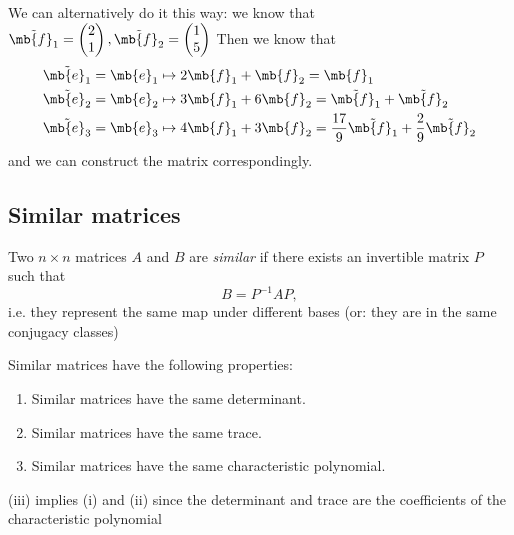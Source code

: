 \documentclass[a4paper]{article}
\begin{document}
\begin{eg}
  We can alternatively do it this way: we know that $\tilde{\mb{f}_1} = 
  \begin{pmatrix}
    2\\1
  \end{pmatrix}, \tilde{\mb{f}_2} = 
  \begin{pmatrix}
    1\\5
  \end{pmatrix}$
  Then we know that 
  \begin{align*}
    \tilde{\mb{e}_1} = \mb{e}_1 &\mapsto 2\mb{f}_1 + \mb{f}_2 = \mb{f}_1\\
    \tilde{\mb{e}_2} = \mb{e}_2 &\mapsto 3\mb{f}_1 + 6\mb{f}_2 = \tilde{\mb{f}_1} + \tilde{\mb{f}_2}\\
    \tilde{\mb{e}_3} = \mb{e}_3 &\mapsto 4\mb{f}_1 + 3\mb{f}_2 = \frac{17}{9} \tilde{\mb{f}_1} + \frac{2}{9}\tilde{\mb{f}_2}
  \end{align*}
  and we can construct the matrix correspondingly.
\end{eg}
\subsection{Similar matrices}
\begin{defi}
  Two $n\times n$ matrices $A$ and $B$ are \emph{similar} if there exists an invertible matrix $P$ such that
  \[
  B = P^{-1}AP,
  \]
  i.e. they represent the same map under different bases (or: they are in the same conjugacy classes)
\end{defi}

\begin{prop}
  Similar matrices have the following properties:
  \begin{enumerate}
  \item Similar matrices have the same determinant.
  \item Similar matrices have the same trace.
  \item Similar matrices have the same characteristic polynomial.
  \end{enumerate}
\end{prop}
\note (iii) implies (i) and (ii) since the determinant and trace are the coefficients of the characteristic polynomial
\end{document}
